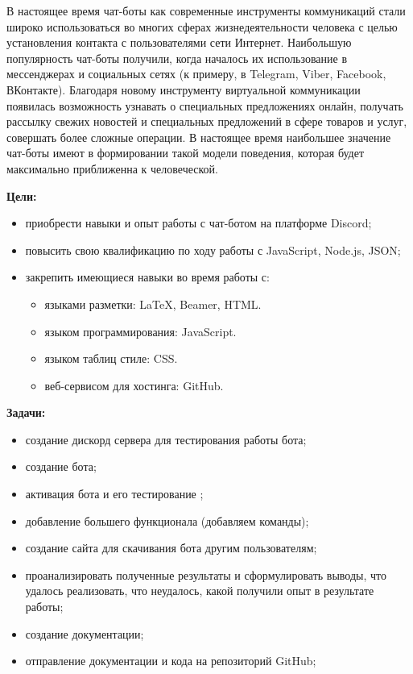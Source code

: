 \documentclass[a4paper,12pt]{article}
\begin{document}
{В настоящее время чат-боты как современные инструменты коммуникаций стали широко использоваться во многих сферах жизнедеятельности человека с целью установления контакта с пользователями сети Интернет. Наибольшую популярность чат-боты получили, когда началось их использование в мессенджерах и социальных сетях (к примеру, в Telegram, Viber, Facebook, ВКонтакте). Благодаря новому инструменту виртуальной коммуникации появилась возможность узнавать о специальных предложениях онлайн, получать рассылку свежих новостей и специальных предложений в сфере товаров и услуг, совершать более сложные операции. В настоящее время наибольшее значение чат-боты имеют в формировании такой модели поведения, которая будет максимально приближенна к человеческой.} 


\textbf{Цели:}
\begin{itemize}
    \item приобрести навыки и опыт работы с чат-ботом на платформе Discord;
    \item повысить свою квалификацию по ходу работы с JavaScript, Node.js, JSON;
    \item закрепить имеющиеся навыки во время работы с:
    \begin{itemize}
     \item языками разметки: LaTeX, Beamer, HTML.
    \item языком программирования: JavaScript.
    \item языком таблиц стиле: CSS.
    \item веб-сервисом для хостинга: GitHub.
    \end{itemize}
\end{itemize}

\textbf{Задачи:} 
\begin{itemize}
    \item создание дискорд сервера для тестирования работы бота;
    \item создание бота;
    \item активация бота и его тестирование ;
    \item добавление большего функционала (добавляем команды);
    \item создание сайта для скачивания бота другим пользователям;
    \item проанализировать полученные результаты и сформулировать выводы, что удалось реализовать, что неудалось, какой получили опыт в результате работы;
    \item создание документации;
    \item отправление документации и кода на репозиторий GitHub;
\end{itemize}
\end{document}
